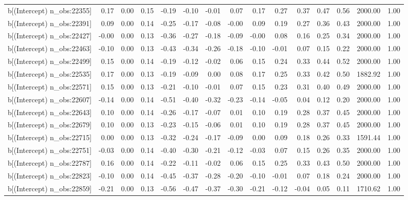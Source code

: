 \begin{table}[ht]
\begin{tabular}{rrrrrrrrrrrrrrr}
  b[(Intercept) n\_obs:22355] & 0.17 & 0.00 & 0.15 & -0.19 & -0.10 & -0.01 & 0.07 & 0.17 & 0.27 & 0.37 & 0.47 & 0.56 & 2000.00 & 1.00 \\ 
  b[(Intercept) n\_obs:22391] & 0.09 & 0.00 & 0.14 & -0.25 & -0.17 & -0.08 & -0.00 & 0.09 & 0.19 & 0.27 & 0.36 & 0.43 & 2000.00 & 1.00 \\ 
  b[(Intercept) n\_obs:22427] & -0.00 & 0.00 & 0.13 & -0.36 & -0.27 & -0.18 & -0.09 & -0.00 & 0.08 & 0.16 & 0.25 & 0.34 & 2000.00 & 1.00 \\ 
  b[(Intercept) n\_obs:22463] & -0.10 & 0.00 & 0.13 & -0.43 & -0.34 & -0.26 & -0.18 & -0.10 & -0.01 & 0.07 & 0.15 & 0.22 & 2000.00 & 1.00 \\ 
  b[(Intercept) n\_obs:22499] & 0.15 & 0.00 & 0.14 & -0.19 & -0.12 & -0.02 & 0.06 & 0.15 & 0.24 & 0.33 & 0.44 & 0.52 & 2000.00 & 1.00 \\ 
  b[(Intercept) n\_obs:22535] & 0.17 & 0.00 & 0.13 & -0.19 & -0.09 & 0.00 & 0.08 & 0.17 & 0.25 & 0.33 & 0.42 & 0.50 & 1882.92 & 1.00 \\ 
  b[(Intercept) n\_obs:22571] & 0.15 & 0.00 & 0.13 & -0.21 & -0.10 & -0.01 & 0.07 & 0.15 & 0.23 & 0.31 & 0.40 & 0.49 & 2000.00 & 1.00 \\ 
  b[(Intercept) n\_obs:22607] & -0.14 & 0.00 & 0.14 & -0.51 & -0.40 & -0.32 & -0.23 & -0.14 & -0.05 & 0.04 & 0.12 & 0.20 & 2000.00 & 1.00 \\ 
  b[(Intercept) n\_obs:22643] & 0.10 & 0.00 & 0.14 & -0.26 & -0.17 & -0.07 & 0.01 & 0.10 & 0.19 & 0.28 & 0.37 & 0.45 & 2000.00 & 1.00 \\ 
  b[(Intercept) n\_obs:22679] & 0.10 & 0.00 & 0.13 & -0.23 & -0.15 & -0.06 & 0.01 & 0.10 & 0.19 & 0.28 & 0.37 & 0.45 & 2000.00 & 1.00 \\ 
  b[(Intercept) n\_obs:22715] & 0.00 & 0.00 & 0.13 & -0.32 & -0.24 & -0.17 & -0.09 & 0.00 & 0.09 & 0.18 & 0.26 & 0.33 & 1591.44 & 1.00 \\ 
  b[(Intercept) n\_obs:22751] & -0.03 & 0.00 & 0.14 & -0.40 & -0.30 & -0.21 & -0.12 & -0.03 & 0.07 & 0.15 & 0.26 & 0.35 & 2000.00 & 1.00 \\ 
  b[(Intercept) n\_obs:22787] & 0.16 & 0.00 & 0.14 & -0.22 & -0.11 & -0.02 & 0.06 & 0.15 & 0.25 & 0.33 & 0.43 & 0.50 & 2000.00 & 1.00 \\ 
  b[(Intercept) n\_obs:22823] & -0.10 & 0.00 & 0.14 & -0.45 & -0.37 & -0.28 & -0.20 & -0.10 & -0.01 & 0.07 & 0.18 & 0.24 & 2000.00 & 1.00 \\ 
  b[(Intercept) n\_obs:22859] & -0.21 & 0.00 & 0.13 & -0.56 & -0.47 & -0.37 & -0.30 & -0.21 & -0.12 & -0.04 & 0.05 & 0.11 & 1710.62 & 1.00 \\ 

\end{tabular}
\end{table}
